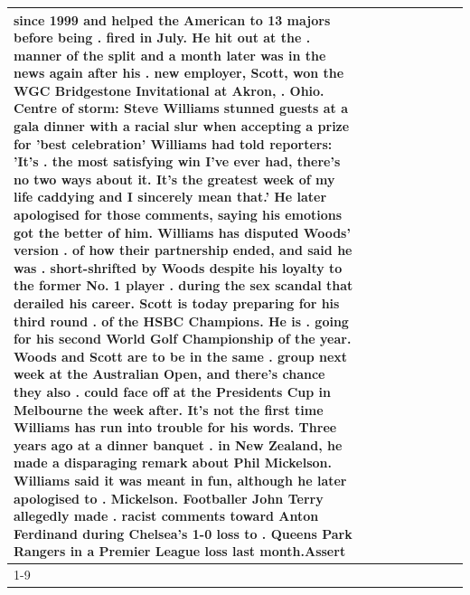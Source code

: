 \begin{table}[H]
\begin{tabular}{lllrlllll}
since 1999 and helped the American to 13 majors before being . fired in July. He hit out at the . manner of the split and a month later was in the news again after his . new employer, Scott, won the WGC Bridgestone Invitational at Akron, . Ohio. Centre of storm: Steve Williams stunned guests at a gala dinner with a racial slur when accepting a prize for 'best celebration' Williams had told reporters: 'It's . the most satisfying win I've ever had, there's no two ways about it. It's the greatest week of my life caddying and I sincerely mean that.' He later apologised for those comments, saying his emotions got the better of him. Williams has disputed Woods' version . of how their partnership ended, and said he was . short-shrifted by Woods despite his loyalty to the former No. 1 player . during the sex scandal that derailed his career. Scott is today preparing for his third round . of the HSBC Champions. He is . going for his second World Golf Championship of the year. Woods and Scott are to be in the same . group next week at the Australian Open, and there's chance they also . could face off at the Presidents Cup in Melbourne the week after. It's not the first time Williams has run into trouble for his words. Three years ago at a dinner banquet . in New Zealand, he made a disparaging remark about Phil Mickelson. Williams said it was meant in fun, although he later apologised to . Mickelson. Footballer John Terry allegedly made . racist comments toward Anton Ferdinand during Chelsea's 1-0 loss to . Queens Park Rangers in a Premier League loss last month.Assert \\
\cline{1-9}

\end{tabular}
\end{table}
